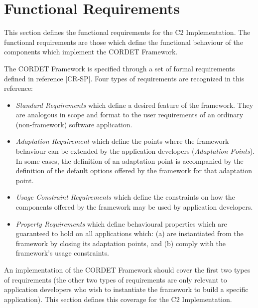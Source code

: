\documentclass{pnp_article}
\begin{document}
\section{Functional Requirements}\label{sec:fncReqs}
This section defines the functional requirements for the C2 Implementation. The functional requirements are those which define the functional behaviour of the components which implement the CORDET Framework.

\label{req:ImplCrReq}

The CORDET Framework is specified through a set of formal requirements defined in reference [CR-SP]. Four types of requirements are recognized in this reference: 

\begin{itemize}
\item{} \textit{Standard Requirements} which define a desired feature of the framework. They are analogous in scope and format to the user requirements of an ordinary (non-framework) software application.
\item{} \textit{Adaptation Requirement} which define the points where the framework behaviour can be extended by the application developers (\textit{Adaptation Points}). In some cases, the definition of an adaptation point is accompanied by the definition of the default options offered by the framework for that adaptation point.  
\item{} \textit{Usage Constraint Requirements} which define the constraints on how the components offered by the framework may be used by application developers.
\item{} \textit{Property Requirements} which define behavioural properties which are guaranteed to hold on all applications which: (a) are instantiated from the framework by closing its adaptation points, and (b) comply with the framework's usage constraints.
\end{itemize}

An implementation of the CORDET Framework should cover the first two types of requirements (the other two types of requirements are only relevant to application developers who wish to instantiate the framework to build a specific application). This section defines this coverage for the C2 Implementation.
\end{document}
